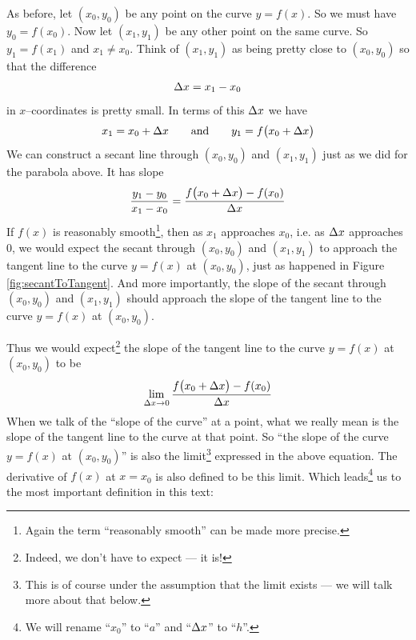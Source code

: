 As before, let $(x_0,y_0)$ be any point on the curve $y=f(x)$.
So we must have $y_0=f(x_0)$. Now let $(x_1,y_1)$ be any other point
on the same curve. So $y_1=f(x_1)$ and $x_1\ne x_0$.  Think of $(x_1,y_1)$
as being pretty close to $(x_0,y_0)$ so that the difference
\begin{align*}
\Delta x=x_1-x_0
\end{align*}
in $x$--coordinates is pretty small. In terms of this  $\Delta x$ we have
\begin{align*}
x_1=x_0+\Delta x\qquad\text{and}\qquad
y_1=f\big(x_0+\Delta x\big)
\end{align*}
We can construct a secant line through $(x_0,y_0)$ and $(x_1,y_1)$ just
as we did for the parabola above. It has slope
\begin{align*}
\frac{y_1-y_0}{x_1-x_0}=\frac{f\big(x_0+\Delta x\big)-f(x_0)}{\Delta x}
\end{align*}
If $f(x)$ is reasonably smooth\footnote{Again the term ``reasonably smooth'' can be made
more precise.}, then as $x_1$ approaches $x_0$, i.e. as $\Delta x$ approaches $0$,
we would expect the secant through $(x_0,y_0)$ and $(x_1,y_1)$ to approach the
tangent line to the curve $y=f(x)$ at $(x_0,y_0)$, just as happened in Figure
\ref{fig:secantToTangent}. And more importantly, the slope of the secant through
$(x_0,y_0)$ and $(x_1,y_1)$ should approach the slope of the tangent line to the
curve  $y=f(x)$ at $(x_0,y_0)$.

Thus we would expect\footnote{Indeed, we don't have to expect --- it is!}
the slope of the tangent line to the curve  $y=f(x)$ at $(x_0,y_0)$ to be
\begin{align*}
\lim_{\Delta x\rightarrow 0}\frac{f\big(x_0+\Delta x\big)-f(x_0)}{\Delta x}
\end{align*}
When we talk of the ``slope of the curve'' at a point, what we really
mean is the slope of the tangent line to the curve at that point. So
``the slope of the curve  $y=f(x)$ at $(x_0,y_0)$'' is also the
limit\footnote{This is of course under the assumption that
the limit exists --- we will talk more about that below.}
expressed in the above equation. The derivative of $f(x)$ at $x=x_0$ is also defined
to be this limit. Which leads\footnote{We will rename ``$x_0$'' to ``$a$'' and ``$\Delta
x$''
to ``$h$''.} us to the most important definition in this text:

